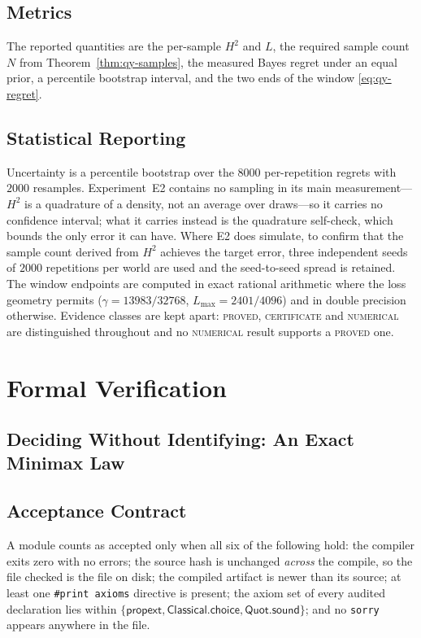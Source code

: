 \documentclass[conference]{IEEEtran}
\theoremstyle{definition}
\newcommand{\PROVED}{\textsc{proved}}
\newcommand{\CERT}{\textsc{certificate}}
\newcommand{\NUM}{\textsc{numerical}}
\begin{document}
\subsection{Metrics}

The reported quantities are the per-sample $H^{2}$ and $L$, the required sample count $N$
from Theorem~\ref{thm:qy-samples}, the measured Bayes regret under an equal prior, a percentile
bootstrap interval, and the two ends of the window \eqref{eq:qy-regret}.

\subsection{Statistical Reporting}

Uncertainty is a percentile bootstrap over the $8000$ per-repetition regrets with $2000$
resamples. Experiment~E2 contains no sampling in its main measurement---$H^{2}$ is a
quadrature of a density, not an average over draws---so it carries no confidence interval;
what it carries instead is the quadrature self-check, which bounds the only error it can have.
Where E2 does simulate, to confirm that the sample count derived from $H^{2}$ achieves the
target error, three independent seeds of $2000$ repetitions per world are used and the
seed-to-seed spread is retained. The window endpoints are computed in exact rational arithmetic where the loss
geometry permits ($\gamma=13983/32768$, $L_{\max}=2401/4096$) and in double precision
otherwise. Evidence classes are kept apart: \PROVED{}, \CERT{} and \NUM{} are distinguished
throughout and no \NUM{} result supports a \PROVED{} one.


\section{Formal Verification}

\subsection{Deciding Without Identifying: An Exact Minimax Law}
\label{sec:sp-verification}

\subsection{Acceptance Contract}

A module counts as accepted only when all six of the following hold: the compiler exits zero
with no errors; the source hash is unchanged \emph{across} the compile, so the file checked is
the file on disk; the compiled artifact is newer than its source; at least one
\texttt{\#print axioms} directive is present; the axiom set of every audited declaration lies
within $\{\textsf{propext},\textsf{Classical.choice},\textsf{Quot.sound}\}$; and no
\texttt{sorry} appears anywhere in the file.
\end{document}
